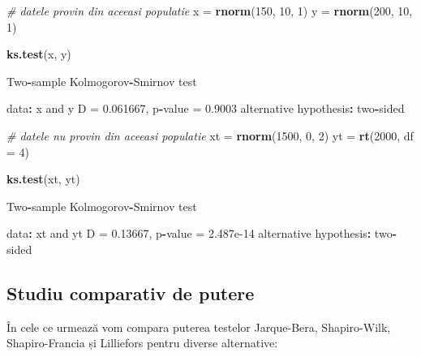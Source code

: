 \documentclass[]{article}
\newenvironment{Shaded}{\begin{snugshade}}{\end{snugshade}}
\newcommand{\KeywordTok}[1]{\textcolor[rgb]{0.13,0.29,0.53}{\textbf{#1}}}
\newcommand{\DataTypeTok}[1]{\textcolor[rgb]{0.13,0.29,0.53}{#1}}
\newcommand{\DecValTok}[1]{\textcolor[rgb]{0.00,0.00,0.81}{#1}}
\newcommand{\FloatTok}[1]{\textcolor[rgb]{0.00,0.00,0.81}{#1}}
\newcommand{\StringTok}[1]{\textcolor[rgb]{0.31,0.60,0.02}{#1}}
\newcommand{\CommentTok}[1]{\textcolor[rgb]{0.56,0.35,0.01}{\textit{#1}}}
\newcommand{\OperatorTok}[1]{\textcolor[rgb]{0.81,0.36,0.00}{\textbf{#1}}}
\newcommand{\NormalTok}[1]{#1}
\begin{document}
\begin{Shaded}
\begin{Highlighting}[]
\CommentTok{# datele provin din aceeasi populatie}
\NormalTok{x =}\StringTok{ }\KeywordTok{rnorm}\NormalTok{(}\DecValTok{150}\NormalTok{, }\DecValTok{10}\NormalTok{, }\DecValTok{1}\NormalTok{)}
\NormalTok{y =}\StringTok{ }\KeywordTok{rnorm}\NormalTok{(}\DecValTok{200}\NormalTok{, }\DecValTok{10}\NormalTok{, }\DecValTok{1}\NormalTok{)}

\KeywordTok{ks.test}\NormalTok{(x, y)}

\NormalTok{    Two}\OperatorTok{-}\NormalTok{sample Kolmogorov}\OperatorTok{-}\NormalTok{Smirnov test}

\NormalTok{data}\OperatorTok{:}\StringTok{  }\NormalTok{x and y}
\NormalTok{D =}\StringTok{ }\FloatTok{0.061667}\NormalTok{, p}\OperatorTok{-}\NormalTok{value =}\StringTok{ }\FloatTok{0.9003}
\NormalTok{alternative hypothesis}\OperatorTok{:}\StringTok{ }\NormalTok{two}\OperatorTok{-}\NormalTok{sided}

\CommentTok{# datele nu provin din aceeasi populatie}
\NormalTok{xt =}\StringTok{ }\KeywordTok{rnorm}\NormalTok{(}\DecValTok{1500}\NormalTok{, }\DecValTok{0}\NormalTok{, }\DecValTok{2}\NormalTok{)}
\NormalTok{yt =}\StringTok{ }\KeywordTok{rt}\NormalTok{(}\DecValTok{2000}\NormalTok{, }\DataTypeTok{df =} \DecValTok{4}\NormalTok{)}

\KeywordTok{ks.test}\NormalTok{(xt, yt)}

\NormalTok{    Two}\OperatorTok{-}\NormalTok{sample Kolmogorov}\OperatorTok{-}\NormalTok{Smirnov test}

\NormalTok{data}\OperatorTok{:}\StringTok{  }\NormalTok{xt and yt}
\NormalTok{D =}\StringTok{ }\FloatTok{0.13667}\NormalTok{, p}\OperatorTok{-}\NormalTok{value =}\StringTok{ }\FloatTok{2.487e-14}
\NormalTok{alternative hypothesis}\OperatorTok{:}\StringTok{ }\NormalTok{two}\OperatorTok{-}\NormalTok{sided}
\end{Highlighting}
\end{Shaded}

\subsection{Studiu comparativ de
putere}\label{studiu-comparativ-de-putere}

În cele ce urmează vom compara puterea testelor Jarque-Bera,
Shapiro-Wilk, Shapiro-Francia și Lilliefors pentru diverse alternative:
\end{document}
